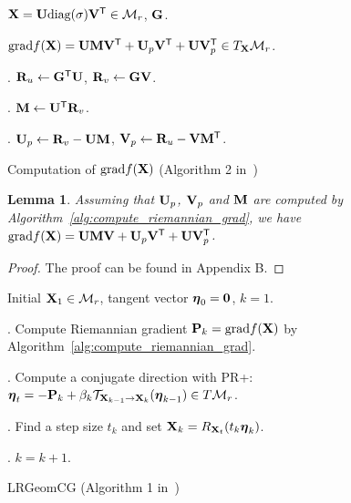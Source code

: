 \documentclass[letterpaper]{article}
\newtheorem{lemma}{Lemma}
\def\M{\mathcal{M}}
\def\bR{{\bf R}}
\def\U{{\bf U}}
\def\V{{\bf V}}
\def\diag{\mbox{diag}}
\def\trsp{{\sf T}}
\def\0{{\bf 0}}
\def\G{{\bf G}}
\def\grad{{\text{grad}}}
\def\bfeta{\mbox{{\boldmath $\eta$}}}
\def\mT{{\mathcal T}}
\def\bM{{\bf M}}
\def\bX{{\bf X}}
\def\bX{{\bf X}}
\def\bP{{\bf P}}
\begin{document}
\begin{small}
\begin{algorithm}
  \begin{algorithmic}
    \REQUIRE $\bX = \U \diag(\sigma) \V^{\trsp} \in \M_{r}$, $\G$.
    
    \ENSURE $\grad f(\bX) = \U \bM \V^{\trsp} + \U_{p} \V^{\trsp} + \U \V_{p}^{\trsp} \in T_{\bX}\M_{r}$.
    
    . $\bR_{u} \leftarrow \G^{\trsp} \U$, $\bR_{v} \leftarrow \G \V$.
    
    . $\bM \leftarrow \U^{\trsp} \bR_{v}$.
    
    . $\U_{p} \leftarrow \bR_{v} - \U \bM$, $\V_{p} \leftarrow \bR_{u} - \V \bM^{\trsp}$.
  \end{algorithmic}
  \caption{Computation of $\grad f(\bX)$ (Algorithm 2 in~\cite{vandereycken2013lowrank})}
  \label{alg:compute_riemannian_grad}
\end{algorithm}
\end{small}



\begin{lemma}
  Assuming that $\U_{p}$, $\V_{p}$ and $\bM$ are computed by Algorithm~\ref{alg:compute_riemannian_grad},
  we have ${\textnormal{grad}} f(\bX) = \U \bM \V + \U_{p} \V^{\trsp} + \U \V^{\trsp}_{p}$.
\end{lemma}

\begin{proof}
  The proof can be found in Appendix B.
\end{proof}



\begin{small}
\begin{algorithm}
  \begin{algorithmic}
    \REQUIRE Initial $\bX_{1} \in \M_{r}$, tangent vector $\bfeta_{0} = \0$, $k = 1$.
    
      
      . Compute Riemannian gradient $\bP_{k} = \grad f(\bX)$ by Algorithm~\ref{alg:compute_riemannian_grad}.
      
      . Compute a conjugate direction with PR+:
             $\bfeta_t = - \bP_{k} + \beta_{k} \mT_{\bX_{k-1} \rightarrow \bX_{k}}( \bfeta_{k-1}) \in T\M_{r}$.
             
      . Find a step size $t_{k}$ and set $\bX_{k} = R_{\bX_{t}}(t_{k} \bfeta_{k})$.
      
      . $k = k + 1$.
      
    \ENDWHILE
  \end{algorithmic}
  \caption{LRGeomCG (Algorithm 1 in~\cite{vandereycken2013lowrank})}
  \label{alg:LRGeomCG}
\end{algorithm}
\end{small}
\end{document}
